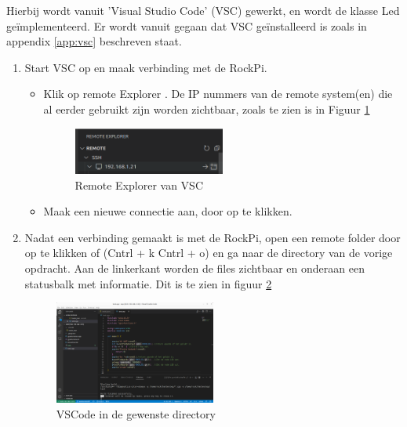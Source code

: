 Hierbij wordt vanuit 'Visual Studio Code' (VSC) gewerkt, en wordt de klasse Led geïmplementeerd. Er wordt vanuit gegaan dat VSC geïnstalleerd is zoals in appendix  \ref{app:vsc} beschreven staat.  
\begin{enumerate}
	\item Start VSC op en maak verbinding met de RockPi.
	\begin{itemize}
		\item Klik op remote Explorer . De IP nummers van de remote system(en) die al eerder gebruikt zijn worden zichtbaar, zoals te zien is in Figuur \ref{fig:remNr}
		\begin{figure}[h!]
			\centering
			\begin{center} 	
				\includegraphics[width=0.5\textwidth]{figuren/remoteExplorer2}
				\caption{Remote Explorer van VSC}
				\label{fig:remNr}   
			\end{center}
		\end{figure}
				 
		\item  Maak een nieuwe connectie aan, door op  te klikken.

      \end{itemize}
      
      \item Nadat een verbinding gemaakt is met de RockPi, open een remote folder door op  te klikken of (Cntrl + k Cntrl + o) en ga naar de directory van de vorige opdracht. Aan de linkerkant worden de files zichtbaar en onderaan een statusbalk met informatie. Dit is te zien in figuur \ref{fig:vncOp}
  		\begin{figure}[h!]
  	\centering
  	\begin{center} 	
  		\includegraphics[width=0.5\textwidth]{figuren/vncSchermOp1}
  		\caption{VSCode in de gewenste directory}
  		\label{fig:vncOp}   
  	\end{center}
  \end{figure}    


\end{enumerate}
